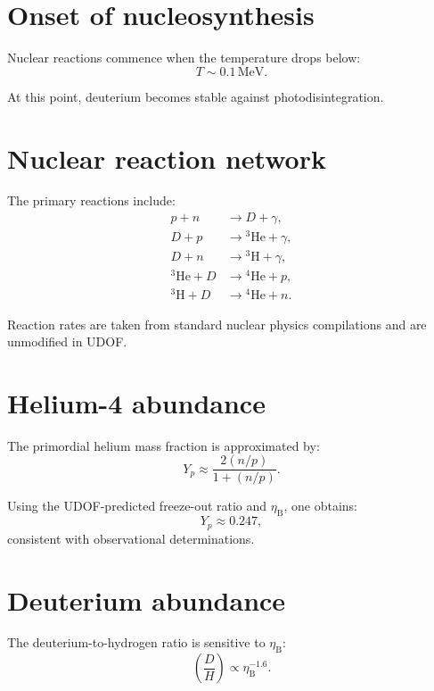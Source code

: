 \documentclass[11pt]{book}
\newcommand{\etaB}{\eta_{\mathrm{B}}}
\begin{document}
\section{Onset of nucleosynthesis}

Nuclear reactions commence when the temperature drops below:
\begin{equation}
T \sim 0.1\,\mathrm{MeV}.
\end{equation}

At this point, deuterium becomes stable against photodisintegration.

\section{Nuclear reaction network}

The primary reactions include:
\begin{align}
p + n &\rightarrow D + \gamma, \\
D + p &\rightarrow {}^3\mathrm{He} + \gamma, \\
D + n &\rightarrow {}^3\mathrm{H} + \gamma, \\
{}^3\mathrm{He} + D &\rightarrow {}^4\mathrm{He} + p, \\
{}^3\mathrm{H} + D &\rightarrow {}^4\mathrm{He} + n.
\end{align}

Reaction rates are taken from standard nuclear physics compilations and
are unmodified in UDOF.

\section{Helium-4 abundance}

The primordial helium mass fraction is approximated by:
\begin{equation}
Y_p \approx \frac{2(n/p)}{1 + (n/p)}.
\end{equation}

Using the UDOF-predicted freeze-out ratio and $\etaB$, one obtains:
\begin{equation}
Y_p \approx 0.247,
\end{equation}
consistent with observational determinations.

\section{Deuterium abundance}

The deuterium-to-hydrogen ratio is sensitive to $\etaB$:
\begin{equation}
\left(\frac{D}{H}\right) \propto \etaB^{-1.6}.
\end{equation}
\end{document}
